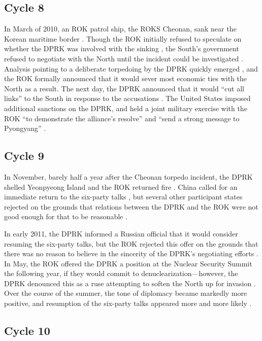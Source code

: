 \subsection{Cycle 8}

In March of 2010, an ROK patrol ship, the ROKS Cheonan, sank near the Korean maritime border \cite{branigan}. Though the ROK initially refused to speculate on whether the DPRK was involved with the sinking \cite{branigan}, the South's government refused to negotiate with the North until the incident could be investigated \cite{davenport}. Analysis pointing to a deliberate torpedoing by the DPRK quickly emerged \cite{reuters}, and the ROK formally announced that it would sever most economic ties with the North as a result. The next day, the DPRK announced that it would ``cut all links'' to the South in response to the accusations \cite{davenport}. The United States imposed additional sanctions on the DPRK, and held a joint military exercise with the ROK ``to demonstrate the alliance's resolve'' and ``send a strong message to Pyongyang'' \cite{starr}.

\subsection{Cycle 9}

In November, barely half a year after the Cheonan torpedo incident, the DPRK shelled Yeonpyeong Island and the ROK returned fire \cite{bbc}. China called for an immediate return to the six-party talks \cite{bbc}, but several other participant states rejected on the grounds that relations between the DPRK and the ROK were not good enough for that to be reasonable \cite{davenport}.

In early 2011, the DPRK informed a Russian official that it would consider resuming the six-party talks, but the ROK rejected this offer on the grounds that there was no reason to believe in the sincerity of the DPRK's negotiating efforts \cite{davenport}. In May, the ROK offered the DPRK a position at the Nuclear Security Summit the following year, if they would commit to denuclearization---however, the DPRK denounced this as a ruse attempting to soften the North up for invasion \cite{davenport}. Over the course of the summer, the tone of diplomacy became markedly more positive, and resumption of the six-party talks appeared more and more likely \cite{davenport}.

\subsection{Cycle 10}

